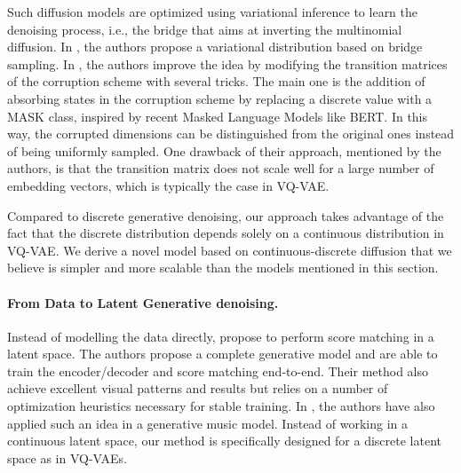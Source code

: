 \documentclass[nohyperref]{article}
\theoremstyle{plain}
\theoremstyle{definition}
\theoremstyle{remark}
\newcommand{\tcr}[1]{\textcolor{red}{#1}}
\begin{document}
Such diffusion models are optimized using variational inference to learn the denoising process, i.e., the bridge that aims at inverting the multinomial diffusion. In \cite{hoogeboom2021argmax}, the authors propose a variational distribution based on bridge sampling.  %
In \cite{austin2021structured}, the authors improve the idea by modifying the transition matrices of the corruption scheme with several tricks. The main one is the addition of absorbing states in the corruption scheme by replacing a discrete value with a MASK class, inspired by recent Masked Language Models like BERT. In this way, the corrupted dimensions can be distinguished from the original ones instead of being uniformly sampled. 
One drawback of their approach, mentioned by the authors, is that the transition matrix does not scale well for a large number of embedding vectors, which is typically the case in VQ-VAE.

Compared to discrete generative denoising, our approach takes advantage of the fact that the discrete distribution depends solely on a continuous distribution in VQ-VAE. We derive a novel model based on continuous-discrete diffusion that we believe is simpler and more scalable than the models mentioned in this section.

\paragraph{From Data to Latent Generative denoising.}
Instead of modelling the data directly, \cite{vahdat2021score} propose to perform score matching in a latent space. The authors propose a complete generative model and are able to train the encoder/decoder and score matching end-to-end. Their method also achieve excellent visual patterns and results but relies on a number of optimization heuristics necessary for stable training. In \cite{mittal2021symbolic}, the authors  have also applied such an idea in a generative music model. Instead of working in a continuous latent space, our method is specifically designed for a discrete latent space as in VQ-VAEs.
\end{document}
